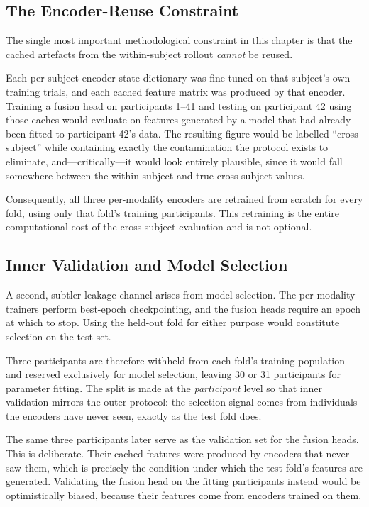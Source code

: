\subsection{The Encoder-Reuse Constraint}
\label{sec:cs_leakage}

The single most important methodological constraint in this chapter is that the
cached artefacts from the within-subject rollout \emph{cannot} be reused.

Each per-subject encoder state dictionary was fine-tuned on that subject's own
training trials, and each cached feature matrix was produced by that encoder.
Training a fusion head on participants 1--41 and testing on participant 42 using
those caches would evaluate on features generated by a model that had already been
fitted to participant 42's data. The resulting figure would be labelled
``cross-subject'' while containing exactly the contamination the protocol exists to
eliminate, and---critically---it would look entirely plausible, since it would fall
somewhere between the within-subject and true cross-subject values.

Consequently, all three per-modality encoders are retrained from scratch for every
fold, using only that fold's training participants. This retraining is the entire
computational cost of the cross-subject evaluation and is not optional.

\subsection{Inner Validation and Model Selection}
\label{sec:cs_innerval}

A second, subtler leakage channel arises from model selection. The per-modality
trainers perform best-epoch checkpointing, and the fusion heads require an epoch at
which to stop. Using the held-out fold for either purpose would constitute selection
on the test set.

Three participants are therefore withheld from each fold's training population and
reserved exclusively for model selection, leaving 30 or 31 participants for parameter
fitting. The split is made at the \emph{participant} level so that inner validation
mirrors the outer protocol: the selection signal comes from individuals the encoders
have never seen, exactly as the test fold does.

The same three participants later serve as the validation set for the fusion heads.
This is deliberate. Their cached features were produced by encoders that never saw
them, which is precisely the condition under which the test fold's features are
generated. Validating the fusion head on the fitting participants instead would be
optimistically biased, because their features come from encoders trained on them.

